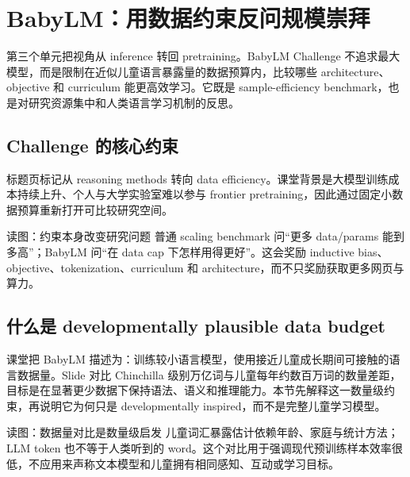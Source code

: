 \section{BabyLM：用数据约束反问规模崇拜}

第三个单元把视角从 inference 转回 pretraining。BabyLM Challenge 不追求最大模型，而是限制在近似儿童语言暴露量的数据预算内，比较哪些 architecture、objective 和 curriculum 能更高效学习。它既是 sample-efficiency benchmark，也是对研究资源集中和人类语言学习机制的反思。

\subsection{Challenge 的核心约束}

标题页标记从 reasoning methods 转向 data efficiency。课堂背景是大模型训练成本持续上升、个人与大学实验室难以参与 frontier pretraining，因此通过固定小数据预算重新打开可比较研究空间。


\begin{knowledgebox}{读图：约束本身改变研究问题}
普通 scaling benchmark 问“更多 data/params 能到多高”；BabyLM 问“在 data cap 下怎样用得更好”。这会奖励 inductive bias、objective、tokenization、curriculum 和 architecture，而不只奖励获取更多网页与算力。
\end{knowledgebox}

\subsection{什么是 developmentally plausible data budget}

课堂把 BabyLM 描述为：训练较小语言模型，使用接近儿童成长期间可接触的语言数据量。Slide 对比 Chinchilla 级别万亿词与儿童每年约数百万词的数量差距，目标是在显著更少数据下保持语法、语义和推理能力。本节先解释这一数量级约束，再说明它为何只是 developmentally inspired，而不是完整儿童学习模型。


\begin{knowledgebox}{读图：数据量对比是数量级启发}
儿童词汇暴露估计依赖年龄、家庭与统计方法；LLM token 也不等于人类听到的 word。这个对比用于强调现代预训练样本效率很低，不应用来声称文本模型和儿童拥有相同感知、互动或学习目标。
\end{knowledgebox}

